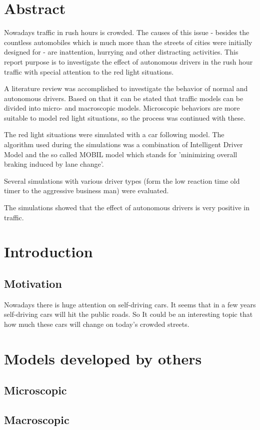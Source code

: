 \documentclass[a4paper,12pt,twoside]{book}
\begin{document}
	\chapter*{Abstract}
		Nowadays traffic in rush hours is crowded. The causes of this issue - besides the countless automobiles which is much more than the streets of cities were initially designed for - are inattention, hurrying and other distracting activities. This report purpose is to investigate the effect of autonomous drivers in the rush hour traffic with special attention to the red light situations.
		
		A literature review was accomplished to investigate the behavior of normal and autonomous drivers. Based on that it can be stated that traffic models can be divided into micro- and macroscopic models. Microscopic behaviors are more suitable to model red light situations, so the process was continued with these.
		
		The red light situations were simulated with a car following model. The algorithm used during the simulations was a combination of Intelligent Driver Model and the so called MOBIL model which stands for 'minimizing overall braking induced by lane change'.
		
		Several simulations with various driver types (form the low reaction time old timer to the aggressive business man) were evaluated.
		
		The simulations showed that the effect of autonomous drivers is very positive in traffic. 
	\chapter{Introduction}
		\section{Motivation}
			Nowadays there is huge attention on self-driving cars. It seems that in a few years self-driving cars will hit the public roads. So It could be an interesting topic that how much these cars will change on today's crowded streets.
	\chapter{Models developed by others}
		\section{Microscopic}
		\section{Macroscopic}
\end{document}
